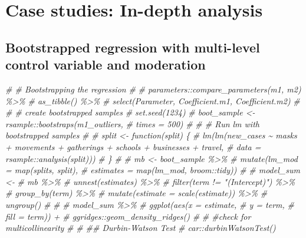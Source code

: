 \documentclass[
]{book}
\newenvironment{Shaded}{\begin{snugshade}}{\end{snugshade}}
\newcommand{\CommentTok}[1]{\textcolor[rgb]{0.56,0.35,0.01}{\textit{#1}}}
\begin{document}
\hypertarget{case-studies-in-depth-analysis}{%
\chapter{Case studies: In-depth analysis}\label{case-studies-in-depth-analysis}}

\hypertarget{bootstrapped-regression}{%
\section{Bootstrapped regression with multi-level control variable and moderation}\label{bootstrapped-regression}}

\begin{Shaded}
\begin{Highlighting}[]
\CommentTok{\# \# Bootstrapping the regression}
\CommentTok{\# }
\CommentTok{\# parameters::compare\_parameters(m1, m2) \%\textgreater{}\%}
\CommentTok{\#   as\_tibble() \%\textgreater{}\%}
\CommentTok{\#   select(Parameter, Coefficient.m1, Coefficient.m2)}
\CommentTok{\# }
\CommentTok{\# \# create bootstrapped samples}
\CommentTok{\# set.seed(1234)  }
\CommentTok{\# boot\_sample \textless{}{-} rsample::bootstraps(m1\_outliers,}
\CommentTok{\#                                            times = 500)}
\CommentTok{\# }
\CommentTok{\# \# Run lm with bootstrapped samples}
\CommentTok{\# }
\CommentTok{\# split \textless{}{-} function(split) \{}
\CommentTok{\#   lm(lm(new\_cases \textasciitilde{} masks + movements + gatherings + schools + businesses + travel,}
\CommentTok{\#         data = rsample::analysis(split)))}
\CommentTok{\# \}}
\CommentTok{\# }
\CommentTok{\# mb \textless{}{-} boot\_sample \%\textgreater{}\%}
\CommentTok{\#   mutate(lm\_mod = map(splits, split),}
\CommentTok{\#          estimates = map(lm\_mod, broom::tidy))}
\CommentTok{\# }
\CommentTok{\# model\_sum \textless{}{-}}
\CommentTok{\#   mb \%\textgreater{}\%}
\CommentTok{\#   unnest(estimates) \%\textgreater{}\%}
\CommentTok{\#   filter(term != "(Intercept)") \%\textgreater{}\%}
\CommentTok{\#   group\_by(term) \%\textgreater{}\%}
\CommentTok{\#   mutate(estimate = scale(estimate)) \%\textgreater{}\%}
\CommentTok{\#   ungroup()}
\CommentTok{\# }
\CommentTok{\# }
\CommentTok{\# model\_sum \%\textgreater{}\%}
\CommentTok{\#   ggplot(aes(x = estimate,}
\CommentTok{\#              y = term,}
\CommentTok{\#              fill = term)) +}
\CommentTok{\#   ggridges::geom\_density\_ridges()}
\CommentTok{\# }
\CommentTok{\# \#check for multicollinearity}
\CommentTok{\# }
\CommentTok{\# \#\# Durbin{-}Watson Test}
\CommentTok{\# car::durbinWatsonTest()}
\end{Highlighting}
\end{Shaded}
\end{document}
